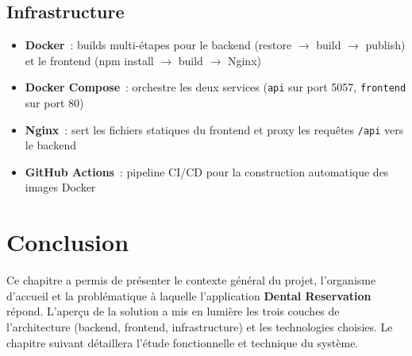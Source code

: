 \subsection{Infrastructure}

\begin{itemize}
    \item \textbf{Docker}~: builds multi-étapes pour le backend (restore $\rightarrow$ build $\rightarrow$ publish) et le frontend (npm install $\rightarrow$ build $\rightarrow$ Nginx)
    \item \textbf{Docker Compose}~: orchestre les deux services (\texttt{api} sur port 5057, \texttt{frontend} sur port 80)
    \item \textbf{Nginx}~: sert les fichiers statiques du frontend et proxy les requêtes \texttt{/api} vers le backend
    \item \textbf{GitHub Actions}~: pipeline CI/CD pour la construction automatique des images Docker
\end{itemize}

\section{Conclusion}

Ce chapitre a permis de présenter le contexte général du projet, l'organisme d'accueil et la problématique à laquelle l'application \textbf{Dental Reservation} répond. L'aperçu de la solution a mis en lumière les trois couches de l'architecture (backend, frontend, infrastructure) et les technologies choisies. Le chapitre suivant détaillera l'étude fonctionnelle et technique du système.
